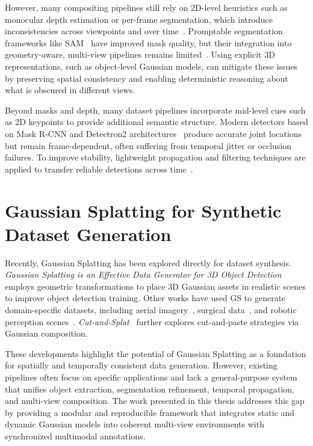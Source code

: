 However, many compositing pipelines still rely on 2D-level heuristics such as monocular depth estimation or per-frame segmentation, which introduce inconsistencies across viewpoints and over time~\cite{InpaintingLimitations2019,MonoDepthLimitations2018}. 
Promptable segmentation frameworks like SAM~\cite{Kirillov2023} have improved mask quality, but their integration into geometry-aware, multi-view pipelines remains limited~\cite{MaskPropagation2019}. 
Using explicit 3D representations, such as object-level Gaussian models, can mitigate these issues by preserving spatial consistency and enabling deterministic reasoning about what is obscured in different views.

Beyond masks and depth, many dataset pipelines incorporate mid-level cues such as 2D keypoints to provide additional semantic structure. 
Modern detectors based on Mask R-CNN and Detectron2 architectures~\cite{He2017MaskRCNN,Detectron22020} produce accurate joint locations but remain frame-dependent, often suffering from temporal jitter or occlusion failures. 
To improve stability, lightweight propagation and filtering techniques are applied to transfer reliable detections across time~\cite{MaskPropagation2019}. 

\section{Gaussian Splatting for Synthetic Dataset Generation}

Recently, Gaussian Splatting has been explored directly for dataset synthesis. 
\textit{Gaussian Splatting is an Effective Data Generator for 3D Object Detection}~\cite{zanjani2025gaussiansplattingeffectivedata} employs geometric transformations to place 3D Gaussian assets in realistic scenes to improve object detection training. 
Other works have used GS to generate domain-specific datasets, including aerial imagery~\cite{SyntheticDrone2023}, surgical data~\cite{SurgicalGS2023}, and robotic perception scenes~\cite{MobileRobotsGS2024}. 
\textit{Cut-and-Splat}~\cite{CutAndSplat2024} further explores cut-and-paste strategies via Gaussian composition.

These developments highlight the potential of Gaussian Splatting as a foundation for spatially and temporally consistent data generation.
However, existing pipelines often focus on specific applications and lack a general-purpose system that unifies object extraction, segmentation refinement, temporal propagation, and multi-view composition. 
The work presented in this thesis addresses this gap by providing a modular and reproducible framework that integrates static and dynamic Gaussian models into coherent multi-view environments with synchronized multimodal annotations.




